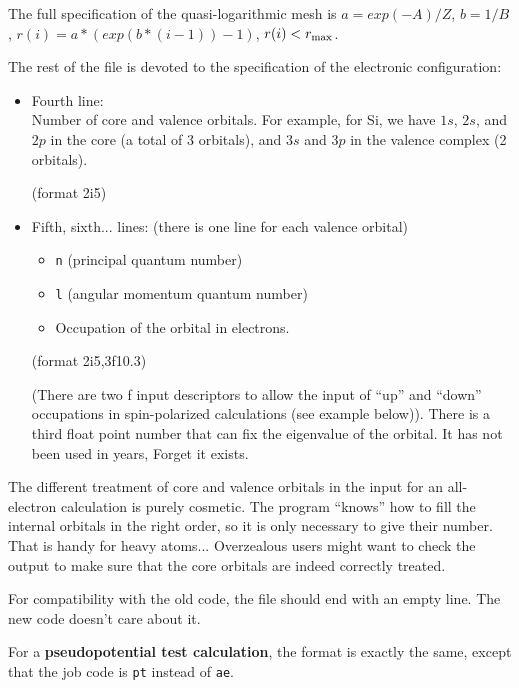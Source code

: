 \documentclass[11pt]{article}
\begin{document}
\begin{itemize}
The full specification of the quasi-logarithmic mesh is
$a = exp(-A)/Z$, $b = 1/B$, $r(i) = a*(exp(b*(i-1))-1)$, $r(i) < r_{\rm max}$.

\end{itemize}

The rest of the file is devoted to the specification of the electronic
configuration:

\begin{itemize} 

\item Fourth line:\\
	 Number of core and valence orbitals. For example, for Si, we
	have $1s$, $2s$, and $2p$ in the core (a total of 3 orbitals), and
	$3s$ and $3p$ in the valence complex (2 orbitals).

	(format 2i5)

\item Fifth, sixth... lines: (there is one line for each valence
orbital)
	\begin{itemize}
	\item {\tt n} (principal quantum number)
	\item {\tt l} (angular momentum quantum number)
	\item Occupation of the orbital in electrons. 
	\end{itemize}

	(format 2i5,3f10.3)

	(There are two f input descriptors to allow the input of ``up''
	and ``down'' occupations in spin-polarized calculations (see
	example below)).
	There is a third float point number that can fix the eigenvalue of the orbital.
	It has not been used in years,  Forget it exists.

\end{itemize}

	
The different treatment of core and valence orbitals in the input for an
all-electron calculation is purely cosmetic. The program ``knows'' how
to fill the internal orbitals in the right order, so it is only
necessary to give their number. That is handy for heavy atoms...
Overzealous users might want to check the output to make sure that the
core orbitals are indeed correctly treated.

For compatibility with the old code, the file should end
with an empty line.  The new code doesn't care about it.

For a {\bf pseudopotential test calculation}, the format is exactly
the same, except that the job code is {\tt pt} instead of {\tt ae}. 
\end{document}
